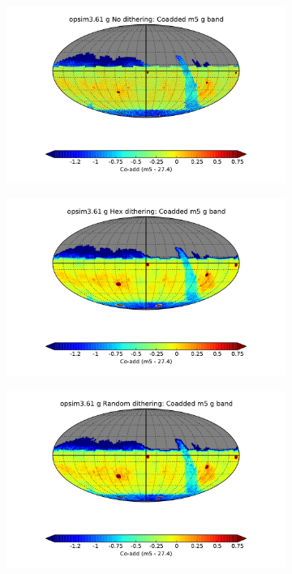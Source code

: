 \documentclass[]{spie}  %
\begin{document}
\begin{figure}
\begin{subfigure}[]{0.3\textwidth}
\includegraphics[width=\textwidth]{figures/opsim3_61_Coadded_m5_g_band_g_No_dithering_HEAL_SkyMap}
\caption[]{}
\label{subfig:coaddgno}
\end{subfigure}
\begin{subfigure}[]{0.3\textwidth}
\includegraphics[width=\textwidth]{figures/opsim3_61_Coadded_m5_g_band_g_Hex_dithering_HEAL_SkyMap}
\caption[]{}
\label{subfig:coaddghex}
\end{subfigure}
\begin{subfigure}[]{0.3\textwidth}
\includegraphics[width=\textwidth]{figures/opsim3_61_Coadded_m5_g_band_g_Random_dithering_HEAL_SkyMap}
\caption[]{}
\label{subfig:coaddgrandom}
\end{subfigure}


\end{figure}
\end{document}
